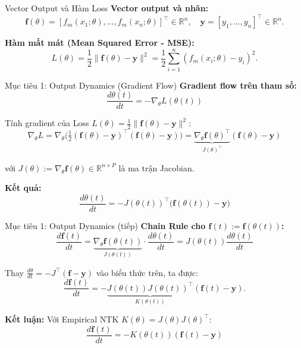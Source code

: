 \begin{frame}{Vector Output và Hàm Loss}
  \textbf{Vector output và nhãn:}
  \[
    \mathbf{f}(\theta) = [f_m(x_1;\theta), \dots, f_m(x_n;\theta)]^\top \in \mathbb{R}^n,
    \quad
    \mathbf{y} = [y_1, \dots, y_n]^\top \in \mathbb{R}^n.
  \]

  \textbf{Hàm mất mát (Mean Squared Error - MSE):}
  \[
    L(\theta) = \frac{1}{2} \|\mathbf{f}(\theta) - \mathbf{y}\|^2
              = \frac{1}{2} \sum_{i=1}^n (f_m(x_i;\theta) - y_i)^2.
  \]
\end{frame}

\begin{frame}{Mục tiêu 1: Output Dynamics (Gradient Flow)}
  \textbf{Gradient flow trên tham số:}
  \[
    \frac{d\theta(t)}{dt} = -\nabla_\theta L(\theta(t))
  \]
  
  Tính gradient của Loss $L(\theta) = \frac{1}{2}\|\mathbf{f}(\theta) - \mathbf{y}\|^2$:
  \[
    \nabla_\theta L
    = \nabla_\theta \Big( \tfrac{1}{2}(\mathbf{f}(\theta) - \mathbf{y})^\top (\mathbf{f}(\theta) - \mathbf{y}) \Big)
    = \underbrace{\nabla_\theta \mathbf{f}(\theta)^\top}_{J(\theta)^\top} (\mathbf{f}(\theta) - \mathbf{y})
  \]

  với $J(\theta) := \nabla_\theta \mathbf{f}(\theta) \in \mathbb{R}^{n \times P}$ là ma trận Jacobian.

  \vspace{0.3cm}
  \textbf{Kết quả:}
  \[
    \frac{d\theta(t)}{dt} = -J(\theta(t))^\top \big(\mathbf{f}(\theta(t)) - \mathbf{y}\big)
  \]
\end{frame}

\begin{frame}{Mục tiêu 1: Output Dynamics (tiếp)}
  \textbf{Chain Rule cho $\mathbf{f}(t) := \mathbf{f}(\theta(t))$:}
  \[
    \frac{d\mathbf{f}(t)}{dt}
    = \underbrace{\nabla_\theta \mathbf{f}(\theta(t))}_{J(\theta(t))} \cdot \frac{d\theta(t)}{dt}
    = J(\theta(t)) \frac{d\theta(t)}{dt}
  \]

  Thay $\frac{d\theta}{dt} = -J^\top (\mathbf{f} - \mathbf{y})$ vào biểu thức trên, ta được:
  \[
    \frac{d\mathbf{f}(t)}{dt} = - \underbrace{J(\theta(t)) J(\theta(t))^\top}_{K(\theta(t))}(\mathbf{f}(t) - \mathbf{y}).
  \]

  \textbf{Kết luận:} Với Empirical NTK $K(\theta) = J(\theta)J(\theta)^\top$:
  \[
    \frac{d\mathbf{f}(t)}{dt} = -K(\theta(t))(\mathbf{f}(t) - \mathbf{y})
  \]
\end{frame}

